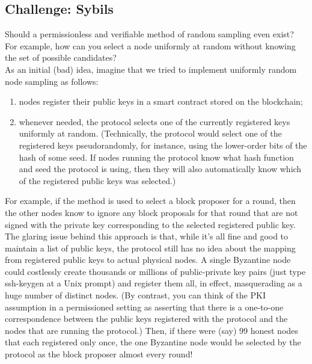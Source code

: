 \subsection{Challenge: Sybils}
Should a permissionless and verifiable method of random sampling even exist?
For example, how can you select a node uniformly at random without knowing the set of
possible candidates?\\
As an initial (bad) idea, imagine that we tried to implement uniformly random node sampling as follows:\\
\begin{enumerate}[label=(\roman*)]
    \item nodes register their public keys in a smart contract stored on the blockchain;
    \item whenever needed, the protocol selects one of the currently registered keys
uniformly at random. (Technically, the protocol would select one of the registered keys pseudorandomly, for instance, using the
lower-order bits of the hash of some seed. If nodes running the
protocol know what hash function and seed the protocol is using, then they will also automatically know
which of the registered public keys was selected.)
\end{enumerate}
For example, if the method is used to select a block proposer for a
round, then the other nodes know to ignore any block proposals for that round that are not
signed with the private key corresponding to the selected registered public key.\\

The glaring issue behind this approach is that, while it’s all fine and good to maintain a
list of public keys, the protocol still has no idea about the mapping from registered public
keys to actual physical nodes. A single Byzantine node could costlessly create thousands or
millions of public-private key pairs (just type ssh-keygen at a Unix prompt) and register
them all, in effect, masquerading as a huge number of distinct nodes. (By contrast, you can think of the PKI assumption in a permissioned setting as asserting that there is
a one-to-one correspondence between the public keys registered with the protocol and the nodes that are
running the protocol.) Then, if there were
(say) 99 honest nodes that each registered only once, the one Byzantine node would be
selected by the protocol as the block proposer almost every round!\\

